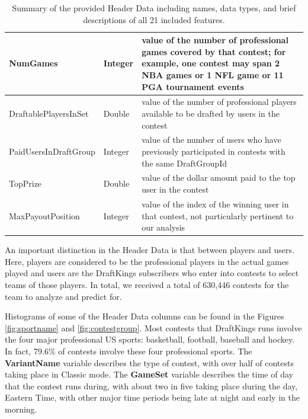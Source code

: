 \begin{table}
\begin{tabular}{|p{5cm}|p{1.6cm}|p{9.5cm}|}
    \hline
    NumGames & Integer & value of the number of professional games covered by that contest; for example, one contest may span 2 NBA games or 1 NFL game or 11 PGA tournament events \\
    \hline
    DraftablePlayersInSet & Double & value of the number of professional players available to be drafted by users in the contest \\
    \hline
    PaidUsersInDraftGroup & Integer & value of the number of users who have previously participated in contests with the same DraftGroupId\\
    \hline
    TopPrize & Double & value of the dollar amount paid to the top user in the contest \\
    \hline
    MaxPayoutPosition & Integer & value of the index of the winning user in that contest, not particularly pertinent to our analysis \\
    \hline
\end{tabular}
\caption{Summary of the provided Header Data including names, data types, and brief descriptions of all 21 included features.}
\label{tab:headercols}
\end{table}

An important distinction in the Header Data is that between players and users. Here, players are considered to be the professional players in the actual games played and users are the DraftKings subscribers who enter into contests to select teams of those players. In total, we received a total of 630,446 contests for the team to analyze and predict for.

Histograms of some of the Header Data columns can be found in the Figures \ref{fig:sportname} and \ref{fig:contestgroup}. Most contests that DraftKings runs involve the four major professional US sports: basketball, football, baseball and hockey. In fact, 79.6\% of contests involve these four professional sports. The \textbf{VariantName} variable describes the type of contest, with over half of contests taking place in Classic mode. The \textbf{GameSet} variable describes the time of day that the contest runs during, with about two in five taking place during the day, Eastern Time, with other major time periods being late at night and early in the morning. 


